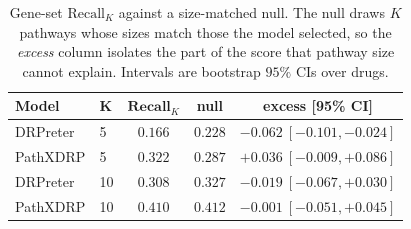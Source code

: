 \begin{table}[!h]
\centering\small
\caption{Gene-set $\mathrm{Recall}_{K}$ against a size-matched null.
The null draws $K$ pathways whose sizes match those the model selected,
so the \emph{excess} column isolates the part of the score that pathway
size cannot explain. Intervals are bootstrap $95\%$ CIs over drugs.}
\label{tab:xai_controls}
\begin{tabular*}{\columnwidth}{@{\extracolsep{\fill}}llccc@{}}
\toprule
\textbf{Model} & $\boldsymbol{K}$ & $\mathbf{Recall}_{K}$ & \textbf{null} & \textbf{excess [95\% CI]} \\
\midrule
DRPreter & 5 & $0.166$ & $0.228$ & $-0.062\ [-0.101,-0.024]$ \\
PathXDRP & 5 & $0.322$ & $0.287$ & $+0.036\ [-0.009,+0.086]$ \\
DRPreter & 10 & $0.308$ & $0.327$ & $-0.019\ [-0.067,+0.030]$ \\
PathXDRP & 10 & $0.410$ & $0.412$ & $-0.001\ [-0.051,+0.045]$ \\
\bottomrule
\end{tabular*}
\end{table}